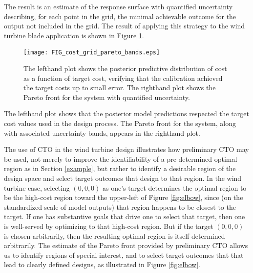 \documentclass[12pt]{article}
\begin{document}
The result is an estimate of the response surface with quantified uncertainty describing, for each point in the grid, the minimal achievable outcome for the output not included in the grid.
%
%
%
The result of applying this strategy to the wind turbine blade application is shown in Figure \ref{fig:known_cost}. 
%
\begin{figure}[h]
\centering
\texttt{[image: FIG\_cost\_grid\_pareto\_bands.eps]}
\caption{The lefthand plot shows the posterior predictive distribution of cost as a function of target cost, verifying that the calibration achieved the target costs up to small error. The righthand plot shows the Pareto front for the system with quantified uncertainty.}
\label{fig:known_cost}
\end{figure}
%
The lefthand plot shows that the posterior model predictions respected the target cost values used in the design process.
%
The Pareto front for the system, along with associated uncertainty bands, appears in the righthand plot.
%
%
%

The use of CTO in the wind turbine design illustrates how preliminary CTO may be used, not merely to improve the identifiability of a pre-determined optimal region as in Section \ref{example}, but rather to identify a desirable region of the design space and select target outcomes that design to that region.
%
In the wind turbine case, selecting $(0,0,0)$ as one's target determines the optimal region to be the high-cost region toward the upper-left of Figure \ref{fig:elbow}, since (on the standardized scale of model outputs) that region happens to be closest to the target.
%
If one has substantive goals that drive one to select that target, then one is well-served by optimizing to that high-cost region.
%
But if the target $(0,0,0)$ is chosen arbitrarily, then the resulting optimal region is itself determined arbitrarily.
%
The estimate of the Pareto front provided by preliminary CTO allows us to identify regions of special interest, and to select target outcomes that that lead to clearly defined designs, as illustrated in Figure \ref{fig:elbow}.
%
\end{document}
